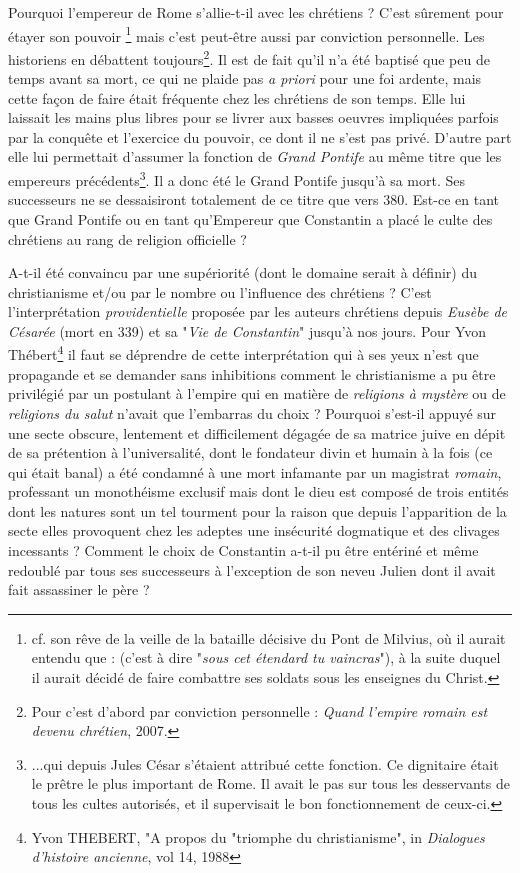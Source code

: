 Pourquoi l'empereur de Rome s'allie-t-il avec les chrétiens ? 
C'est sûrement pour étayer son pouvoir \footnote{cf. son rêve de la veille de la bataille décisive du Pont de Milvius, où il aurait entendu que :  (c'est à dire "\emph{sous cet étendard tu vaincras}"), à la suite duquel il aurait décidé de faire combattre ses soldats sous les enseignes du Christ.} mais c'est peut-être aussi par conviction personnelle. Les historiens en débattent toujours\footnote{Pour  c'est d'abord par conviction personnelle : \emph{Quand l'empire romain est devenu chrétien}, 2007.}. Il est de fait qu'il n'a été baptisé que peu de temps avant sa mort, ce qui ne plaide pas \emph{a priori} pour une foi ardente, mais cette façon de faire était fréquente chez les chrétiens de son temps. Elle lui laissait les mains plus libres pour se livrer aux basses oeuvres impliquées parfois par la conquête et l'exercice du pouvoir, ce dont il ne s'est pas privé. D'autre part elle lui permettait d'assumer la fonction de \emph{Grand Pontife} au même titre que les empereurs précédents\footnote{...qui depuis Jules César s'étaient attribué cette fonction. Ce dignitaire était le prêtre le plus important de Rome. Il avait le pas sur tous les desservants de tous les cultes autorisés, et il supervisait le bon fonctionnement de ceux-ci.}. Il a donc été le Grand Pontife jusqu'à sa mort. Ses successeurs ne se dessaisiront totalement de ce titre que vers 380. Est-ce en tant que Grand Pontife ou en tant qu'Empereur que Constantin a placé le culte des chrétiens au rang de religion officielle ? 

A-t-il été convaincu par une supériorité (dont le domaine serait à définir) du christianisme et/ou par le nombre ou l'influence des chrétiens ? C'est l'interprétation \emph{providentielle} proposée par les auteurs chrétiens depuis \emph{Eusèbe de Césarée} (mort en 339) et sa "\emph{Vie de Constantin}" jusqu'à nos jours. Pour Yvon Thébert\footnote{Yvon THEBERT, "A propos du "triomphe du christianisme", in \emph{Dialogues d'histoire ancienne}, vol 14, 1988} il faut se déprendre de cette interprétation qui à ses yeux n'est que propagande et se demander sans inhibitions comment le christianisme a pu être privilégié par un postulant à l'empire qui en matière de \emph{religions à mystère} ou de \emph{religions du salut} n'avait que l'embarras du choix ? Pourquoi s'est-il appuyé sur une secte obscure, lentement et difficilement dégagée de sa matrice juive en dépit de sa prétention à l'universalité, dont le fondateur divin et humain à la fois (ce qui était banal) a été condamné à une mort infamante par un magistrat \emph{romain}, professant un monothéisme exclusif mais dont le dieu est composé de trois entités dont les natures sont un tel tourment pour la raison que depuis l'apparition de la secte elles provoquent chez les adeptes une insécurité dogmatique et des clivages incessants ?  Comment le choix de Constantin a-t-il pu être entériné et même redoublé par tous ses successeurs à l'exception de son neveu Julien dont il avait fait assassiner le père ?  


